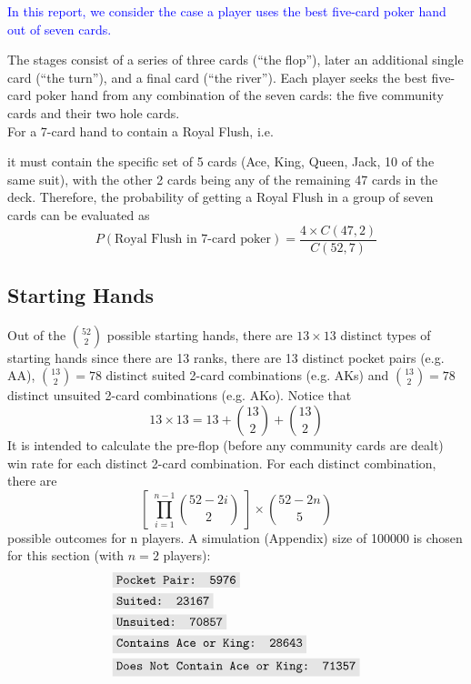 \documentclass{article}
\newcommand{\code}[1]{\colorbox{codegray}{\texttt{#1}}}
\begin{document}
\begin{center}
    \textcolor{blue}{
        In this report, we consider the case a player uses the best 
        five-card poker hand out of seven cards.
    }
\end{center}
The stages consist of a series of three cards (``the flop''), later an 
additional single card (``the turn''), and a final card (``the river''). 
Each player seeks the best five-card poker hand from any combination of 
the seven cards: the five community cards and their two hole cards.
\vspace*{5mm}\\
For a 7-card hand to contain a Royal Flush, i.e.
\begin{center}
\end{center}
it must contain the specific set of 5 cards 
(Ace, King, Queen, Jack, 10 of the same suit), 
with the other 2 cards being any of the remaining 47 cards in the deck. 
Therefore, the probability of getting a Royal Flush in a group of seven 
cards can be evaluated as 
\[
P(\text{Royal Flush in 7-card poker}) = \frac{4 \times C(47, 2)}{C(52, 7)}
\]

\newpage

\subsection*{Starting Hands}

Out of the $\displaystyle \binom{52}{2}$ possible starting hands, there 
are $13 \times 13$ distinct types of starting hands since there are 13 
ranks, there are 13 distinct pocket pairs (e.g. AA), $\displaystyle 
\binom{13}{2} = 78$ distinct suited 2-card combinations (e.g. AKs) 
and $\displaystyle \binom{13}{2} = 78$ distinct unsuited 2-card 
combinations (e.g. AKo). Notice that 
\[
    13 \times 13 = 13 + \binom{13}{2} + \binom{13}{2}
\]
It is intended to calculate the pre-flop 
(before any community cards are dealt) win rate for each distinct 
2-card combination. For each distinct combination, there are 
\[
    \left[ \; \prod_{i = 1}^{n - 1} \binom{52 - 2i}{2} \; \right] \times \binom{52 - 2n}{5}
\] 
possible outcomes for n players. A simulation (Appendix) size of 100000 is chosen for 
this section (with $n = 2$ players):
\begin{align*}
    & \code{Pocket Pair: 5976} \\
    & \code{Suited: 23167} \\
    & \code{Unsuited: 70857} \\
    & \code{Contains Ace or King: 28643} \\
    & \code{Does Not Contain Ace or King: 71357}
\end{align*}
\end{document}
